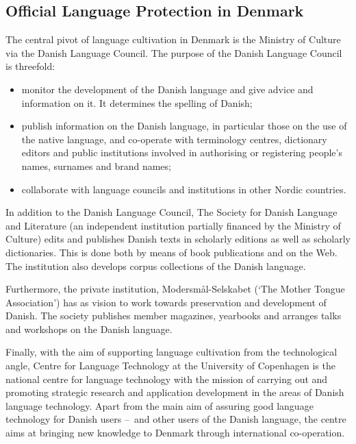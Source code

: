 \begin{multicols}{2}
\subsection{Official Language Protection in Denmark}

The central pivot of language cultivation in Denmark is the Ministry of Culture via the Danish Language Council. The purpose of the Danish Language Council is threefold: 
\begin{itemize}
\item	monitor the development of the Danish language and give advice and information on it. It determines the spelling of Danish;
\item	publish information on the Danish language, in particular those on the use of the native language, and co-operate with terminology centres, dictionary editors and public institutions involved in authorising or registering people's names,  surnames and brand names;
\item	collaborate with language councils and institutions in other Nordic countries.	
\end{itemize}
In addition to the Danish Language Council, The Society for Danish Language and Literature (an independent institution partially financed by the Ministry of Culture) edits and publishes Danish texts in scholarly editions as well as scholarly dictionaries. This is done both by means of book publications and on the Web. The institution also develops corpus collections of the Danish language.


Furthermore, the private institution, Moders\-m\aa l-Selskabet (`The Mother Tongue Association') has as vision to work towards preservation and development of Danish. The society publishes member magazines,  yearbooks and arranges talks and workshops on the Danish language.


Finally, with the aim of supporting language cultivation from the technological angle, Centre for Language Technology at the University of Copenhagen is the national centre for language technology with the mission of carrying out and promoting strategic research and application development in the areas of Danish language technology. Apart from the main aim of assuring good language technology for Danish users --~and other users of the Danish language, the centre aims at bringing new knowledge to Denmark through international co-operation.


\end{multicols}

